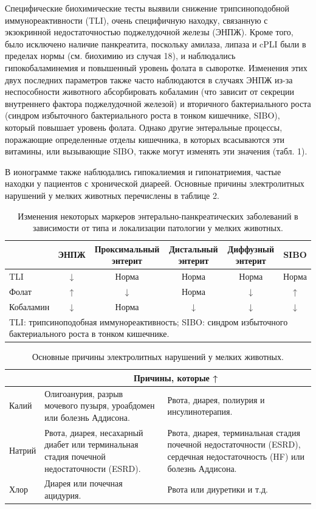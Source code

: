 \documentclass[a4paper,12pt]{book}
\begin{document}
Специфические биохимические тесты выявили снижение трипсиноподобной иммунореактивности (TLI), очень специфичную находку, связанную с экзокринной недостаточностью поджелудочной железы (ЭНПЖ). Кроме того, было исключено наличие панкреатита, поскольку амилаза, липаза и cPLI были в пределах нормы (см. биохимию из случая 18), и наблюдались гипокобаламинемия и повышенный уровень фолата в сыворотке. Изменения этих двух последних параметров также часто наблюдаются в случаях ЭНПЖ из-за неспособности животного абсорбировать кобаламин (что зависит от секреции внутреннего фактора поджелудочной железой) и вторичного бактериального роста (синдром избыточного бактериального роста в тонком кишечнике, SIBO), который повышает уровень фолата. Однако другие энтеральные процессы, поражающие определенные отделы кишечника, в которых всасываются эти витамины, или вызывающие SIBO, также могут изменять эти значения (табл. 1).

В ионограмме также наблюдались гипокалиемия и гипонатриемия, частые находки у пациентов с хронической диареей. Основные причины электролитных нарушений у мелких животных перечислены в таблице 2.

\begin{table}[htbp]
\centering
\caption{Изменения некоторых маркеров энтерально-панкреатических заболеваний в зависимости от типа и локализации патологии у мелких животных.}
\begin{tabular}{lccccc}
\toprule
& ЭНПЖ & Проксимальный энтерит & Дистальный энтерит & Диффузный энтерит & SIBO \\
\midrule
TLI & ↓ & Норма & Норма & Норма & Норма \\
Фолат & ↑ & ↓ & Норма & ↓ & ↑ \\
Кобаламин & ↓ & Норма & ↓ & ↓ & ↓ \\
\bottomrule
\multicolumn{6}{l}{TLI: трипсиноподобная иммунореактивность; SIBO: синдром избыточного бактериального роста в тонком кишечнике.}
\end{tabular}
\end{table}

\begin{table}[htbp]
\centering
\caption{Основные причины электролитных нарушений у мелких животных.}
\begin{tabular}{p{4cm}p{4cm}p{4cm}}
\toprule
& \multicolumn{2}{c}{Причины, которые ↑} & \multicolumn{2}{c}{Причины, которые ↓} \\
\midrule
Калий & Олигоанурия, разрыв мочевого пузыря, уроабдомен или болезнь Аддисона. & Рвота, диарея, полиурия и инсулинотерапия. \\
Натрий & Рвота, диарея, несахарный диабет или терминальная стадия почечной недостаточности (ESRD). & Рвота, диарея, терминальная стадия почечной недостаточности (ESRD), сердечная недостаточность (HF) или болезнь Аддисона. \\
Хлор & Диарея или почечная ацидурия. & Рвота или диуретики и т.д. \\
\bottomrule
\end{tabular}
\end{table}
\end{document}
